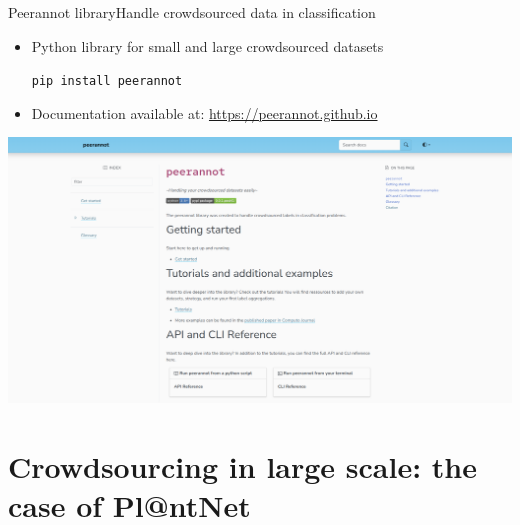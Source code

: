 \begin{frame}{Peerannot library}{Handle crowdsourced data in classification}
    \begin{itemize}
        \item Python library for small and large crowdsourced datasets \\
        \begin{center} \texttt{pip install peerannot}\end{center}
        \item Documentation available at: \url{https://peerannot.github.io}
    \end{itemize}
    \begin{center}
        \includegraphics[width=\textwidth]{./images/peerannot_web.png}
    \end{center}
\end{frame}

\section{Crowdsourcing in large scale: the case of Pl@ntNet}

